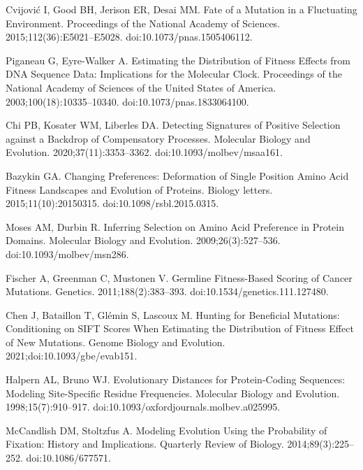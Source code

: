 \documentclass[10pt,letterpaper]{article}
\begin{document}
\begin{thebibliography}{10}
Cvijovi{\'c} I, Good BH, Jerison ER, Desai MM.
\newblock Fate of a Mutation in a Fluctuating Environment.
\newblock Proceedings of the National Academy of Sciences.
2015;112(36):E5021--E5028.
\newblock doi:{10.1073/pnas.1505406112}.

Piganeau G, {Eyre-Walker} A.
\newblock Estimating the Distribution of Fitness Effects from {{DNA}} Sequence
Data: {{Implications}} for the Molecular Clock.
\newblock Proceedings of the National Academy of Sciences of the United States
of America. 2003;100(18):10335--10340.
\newblock doi:{10.1073/pnas.1833064100}.

Chi PB, Kosater WM, Liberles DA.
\newblock Detecting {{Signatures}} of {{Positive Selection}} against a
{{Backdrop}} of {{Compensatory Processes}}.
\newblock Molecular Biology and Evolution. 2020;37(11):3353--3362.
\newblock doi:{10.1093/molbev/msaa161}.

Bazykin GA.
\newblock Changing Preferences: Deformation of Single Position Amino Acid
Fitness Landscapes and Evolution of Proteins.
\newblock Biology letters. 2015;11(10):20150315.
\newblock doi:{10.1098/rsbl.2015.0315}.

Moses AM, Durbin R.
\newblock Inferring {{Selection}} on {{Amino Acid Preference}} in {{Protein
Domains}}.
\newblock Molecular Biology and Evolution. 2009;26(3):527--536.
\newblock doi:{10.1093/molbev/msn286}.

Fischer A, Greenman C, Mustonen V.
\newblock Germline {{Fitness-Based Scoring}} of {{Cancer Mutations}}.
\newblock Genetics. 2011;188(2):383--393.
\newblock doi:{10.1534/genetics.111.127480}.

Chen J, Bataillon T, Gl{\'e}min S, Lascoux M.
\newblock Hunting for Beneficial Mutations: Conditioning on {{SIFT}} Scores
When Estimating the Distribution of Fitness Effect of New Mutations.
\newblock Genome Biology and Evolution. 2021;doi:{10.1093/gbe/evab151}.

Halpern AL, Bruno WJ.
\newblock Evolutionary Distances for Protein-Coding Sequences: Modeling
Site-Specific Residue Frequencies.
\newblock Molecular Biology and Evolution. 1998;15(7):910--917.
\newblock doi:{10.1093/oxfordjournals.molbev.a025995}.

McCandlish DM, Stoltzfus A.
\newblock Modeling Evolution Using the Probability of Fixation: {{History}} and
Implications.
\newblock Quarterly Review of Biology. 2014;89(3):225--252.
\newblock doi:{10.1086/677571}.


\end{thebibliography}
\end{document}
